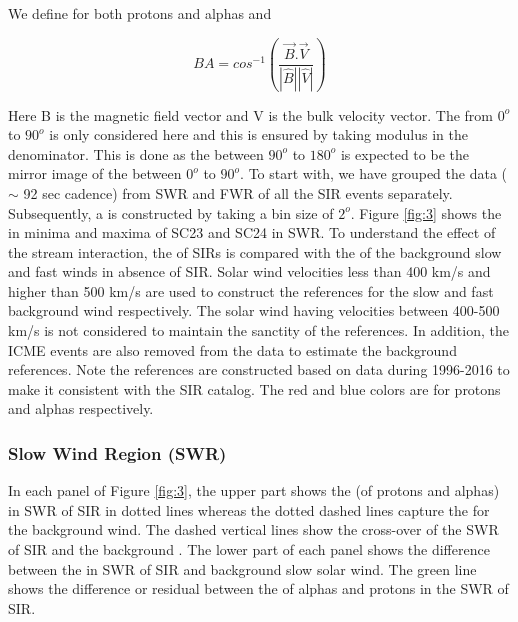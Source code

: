 \documentclass[letters,usenatbib]{mnras}
\begin{document}
We define  for both protons and alphas and   

\begin{equation}
BA= cos^{-1}(\frac{\vec{B}.\vec{V}}{|\hat{B}||\hat{V}|})
\end{equation}


Here B is the magnetic field vector and V is the bulk velocity vector. The   from $0^o$ to $90^o$ is only considered here and this is ensured by taking modulus in the denominator. This is done as the  between $90^o$ to $180^o$ is expected to be the mirror image of the   between $0^o$ to $90^o$. To start with, we have grouped the  data ($\sim$ 92 sec cadence) from SWR and FWR of all the SIR events separately. Subsequently, a  is constructed by taking a bin size of $2^o$.  Figure \ref{fig:3} shows the  in minima and maxima of SC23 and SC24 in SWR. To understand the effect of the stream interaction, the   of SIRs is compared with the  of the background slow and fast winds in absence of SIR. Solar wind velocities less than 400 km/s and higher than 500 km/s are used to construct the references for the slow and fast background wind respectively. The solar wind having velocities between 400-500 km/s is not considered to maintain the sanctity of the references. In addition, the ICME events are also removed from the data to estimate the background references. Note the references are constructed based on data during 1996-2016 to make it consistent with the SIR catalog.  The red and blue colors are for protons and alphas respectively. 


\subsubsection{Slow Wind Region (SWR)}

In each panel of Figure \ref{fig:3}, the upper part shows the  (of protons and alphas) in SWR of SIR in dotted lines whereas the dotted dashed lines capture the  for the background wind. The dashed vertical lines show the cross-over of the SWR of SIR and the background . The lower part of each panel shows the difference between the  in SWR of SIR and background slow solar wind. The green line shows the difference or residual between the  of alphas and protons in the SWR of SIR. 
\end{document}
